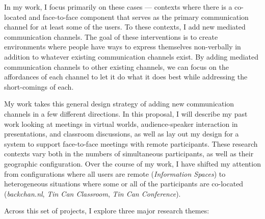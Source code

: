 \documentclass{tufte-handout}
\begin{document}

In my work, I focus primarily on these cases --- contexts where there is a co-located and face-to-face component that serves as the primary communication channel for at least some of the users. To these contexts, I add new mediated communication channels. The goal of these interventions is to create environments where people have ways to express themselves non-verbally in addition to whatever existing communication channels exist. By adding mediated communication channels to other existing channels, we can focus on the affordances of each channel to let it do what it does best while addressing the short-comings of each.


My work takes this general design strategy of adding new communication channels in a few different directions. In this proposal, I will describe my past work looking at meetings in virtual worlds, audience-speaker interaction in presentations, and classroom discussions, as well as lay out my design for a system to support face-to-face meetings with remote participants. These research contexts vary both in the numbers of simultaneous participants, as well as their geographic configuration. Over the course of my work, I have shifted my attention from configurations where all users are remote (\emph{Information Spaces}) to heterogeneous situations where some or all of the participants are co-located (\emph{backchan.nl}, \emph{Tin Can Classroom}, \emph{Tin Can Conference}). 

Across this set of projects, I explore three major research themes:
\end{document}
